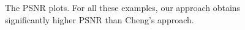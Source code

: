 \begin{figure}[t]
  \caption{The PSNR plots. For all these examples, our approach obtains significantly higher PSNR than Cheng's approach.}
\label{fig:psnr-more}
\end{figure}

